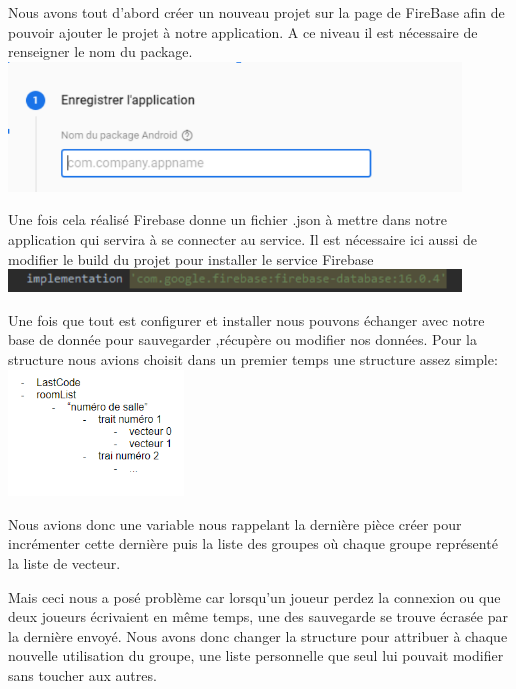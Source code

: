 \documentclass[12pt]{article}
\begin{document}
	\par
	Nous avons tout d'abord créer un nouveau projet sur la page de FireBase afin de pouvoir ajouter le projet à notre application. A ce niveau il est nécessaire de renseigner le nom du package.
	\newline
	\includegraphics[width=0.9\textwidth]{Capture5.png}
	\newline
	\par
	Une fois cela réalisé Firebase donne un fichier .json à mettre dans notre application qui servira à se connecter au service. Il est nécessaire ici aussi de modifier le build du projet pour installer le service Firebase
	\newline
	\includegraphics[width=0.9\textwidth]{Capture4.png}
	\newline
	\par
	Une fois que tout est configurer et installer nous pouvons échanger avec notre base de donnée pour sauvegarder ,récupère ou modifier nos données.\newline
	Pour la structure nous avions choisit dans un premier temps une structure assez simple:
	\newline
	\includegraphics[width=0.35\textwidth]{Capture2.png}
	\newline
	\par
	Nous avions donc une variable nous rappelant la dernière pièce créer pour incrémenter cette dernière puis la liste des groupes où chaque groupe représenté la liste de vecteur.
	\par
	Mais ceci nous a posé problème car lorsqu'un joueur perdez la connexion ou que deux joueurs écrivaient en même temps, une des sauvegarde se trouve écrasée par la dernière envoyé. Nous avons donc changer la structure pour attribuer à chaque nouvelle utilisation du groupe, une liste personnelle que seul lui pouvait modifier sans toucher aux autres.
\end{document}
